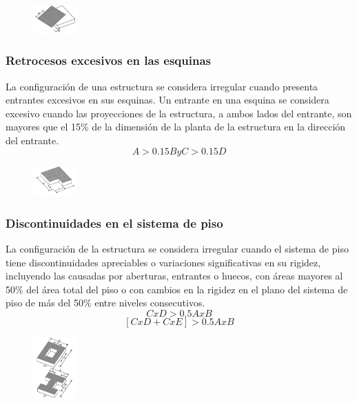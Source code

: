\documentclass{report}
\begin{document}
\begin{figure}[h]
    \centering
    \includegraphics[width=0.15\textwidth]{imagenes/irregularidad_torsional.png}
\end{figure}

\subsubsection{Retrocesos excesivos en las esquinas }
La configuraci\'on de una estructura se considera irregular cuando presenta entrantes excesivos en sus esquinas. 
Un entrante en una esquina se considera excesivo cuando las proyecciones de la estructura, a ambos lados del entrante, 
son mayores que el 15\% de la dimensi\'on de la planta de la estructura en la direcci\'on del entrante.
$$A > 0.15B y C > 0.15D$$

\begin{figure}[h]
    \centering
    \includegraphics[width=0.15\textwidth]{imagenes/retrocesos_excesivos_en_las_esquinas.png}
\end{figure}

\subsubsection{Discontinuidades en el sistema de piso }
La configuraci\'on de la estructura se considera irregular cuando el sistema de piso tiene discontinuidades apreciables o variaciones 
significativas en su rigidez, incluyendo las causadas por aberturas, entrantes o huecos, con \'areas mayores al 50\% del 
\'area total del piso o con cambios en la rigidez en el plano del sistema de piso de m\'as del 50\% entre niveles consecutivos.
$$CxD > 0.5AxB $$
$$[CxD + CxE] > 0.5AxB$$

\begin{figure}[h]
    \centering
    \includegraphics[width=0.15\textwidth]{imagenes/discontinuidades_en_el_sistema_de_piso.png}
\end{figure}
\end{document}
